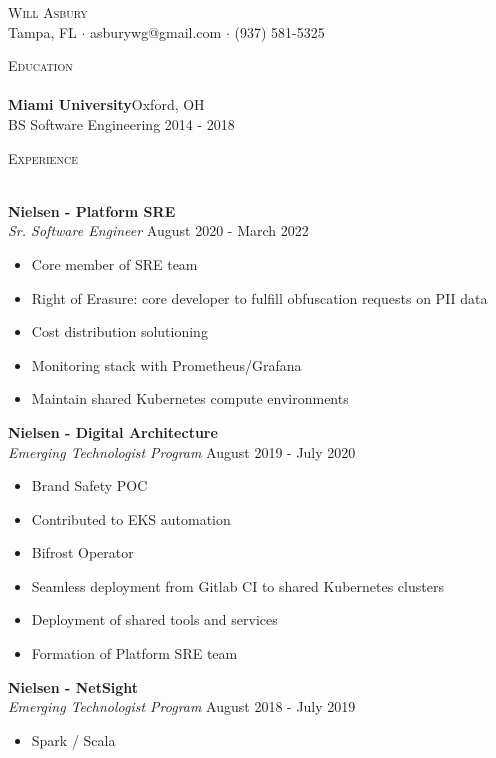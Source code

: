 \documentclass[a4paper]{article}
\newcommand{\lineunder} {
    \vspace*{-8pt} \\
    \hspace*{-18pt} \hrulefill \\
}
\newcommand{\header} [1] {
    {\hspace*{-18pt}\vspace*{6pt} \textsc{#1}}
    \vspace*{-6pt} \lineunder
}
\begin{document}
\vspace*{-40pt}

    

\vspace*{-10pt}
\begin{center}
	{\Huge \scshape {Will Asbury}}\\
	Tampa, FL $\cdot$ asburywg@gmail.com $\cdot$ (937) 581-5325\\
\end{center}

\header{Education}
\textbf{Miami University}\hfill Oxford, OH\\
BS Software Engineering \hfill 2014 - 2018\\
\vspace{2mm}

\header{Experience}
\vspace{1mm}

\textbf{Nielsen - Platform SRE}\\
\textit{Sr. Software Engineer} \hfill August 2020 - March 2022\\
\vspace{-1mm}
\begin{itemize} \itemsep 1pt
	\item Core member of SRE team
	\item Right of Erasure: core developer to fulfill obfuscation requests on PII data
	\item Cost distribution solutioning
	\item Monitoring stack with Prometheus/Grafana
	\item Maintain shared Kubernetes compute environments
\end{itemize}
\textbf{Nielsen - Digital Architecture}\\
\textit{Emerging Technologist Program} \hfill August 2019 - July 2020\\
\vspace{-1mm}
\begin{itemize} \itemsep 1pt
	\item Brand Safety POC
	\item Contributed to EKS automation
	\item Bifrost Operator
	\item Seamless deployment from Gitlab CI to shared Kubernetes clusters
	\item Deployment of shared tools and services
	\item Formation of Platform SRE team
\end{itemize}
\textbf{Nielsen - NetSight}\\
\textit{Emerging Technologist Program} \hfill August 2018 - July 2019\\
\vspace{-1mm}
\begin{itemize} \itemsep 1pt
	\item Spark / Scala
\end{itemize}
\end{document}

